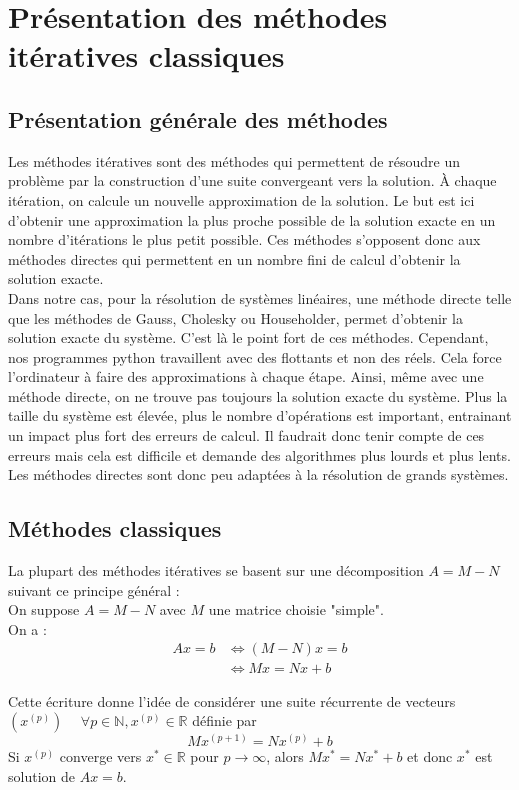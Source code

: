 \chapter{Présentation des méthodes itératives classiques}
\section{Présentation générale des méthodes}
Les méthodes itératives sont des méthodes qui permettent de résoudre un problème par la construction d'une suite convergeant vers la solution. À chaque itération, on calcule un nouvelle approximation de la solution. Le but est ici d'obtenir une approximation la plus proche possible de la solution exacte en un nombre d'itérations le plus petit possible. Ces méthodes s'opposent donc aux méthodes directes qui permettent en un nombre fini de calcul d'obtenir la solution exacte.\\

Dans notre cas, pour la résolution de systèmes linéaires, une méthode directe telle que les méthodes de Gauss, Cholesky ou Householder, permet d'obtenir la solution exacte du système. C'est là le point fort de ces méthodes. Cependant, nos programmes python travaillent avec des flottants et non des réels. Cela force l'ordinateur à faire des approximations à chaque étape. Ainsi, même avec une méthode directe, on ne trouve pas toujours la solution exacte du système. Plus la taille du système est élevée, plus le nombre d'opérations est important, entrainant un impact plus fort des erreurs de calcul. Il faudrait donc tenir compte de ces erreurs mais cela est difficile et demande des algorithmes plus lourds et plus lents. Les méthodes directes sont donc peu adaptées à la résolution de grands systèmes.

\section{Méthodes classiques}
La plupart des méthodes itératives se basent sur une décomposition $A = M-N$ suivant ce principe général : \\
On suppose $A = M-N$ avec $M$ une matrice choisie "simple".\\
On a :
\begin{align*}
Ax = b &\Leftrightarrow \left(M-N\right)x = b\\
		 &\Leftrightarrow Mx = Nx + b
\end{align*}

Cette écriture donne l'idée de considérer une suite récurrente de vecteurs $\left(x^{(p)}\right) \hspace{15pt} \forall p \in \mathbb{N}, x^{(p)} \in \mathbb{R}$ définie par
$$M x^{(p+1)} = Nx^{(p)} + b$$
Si $x^{(p)}$ converge vers $x^* \in \mathbb{R}$ pour $p \to \infty$, alors $Mx^* = Nx^*+b$ et donc $x^*$ est solution de $Ax = b$.\\

